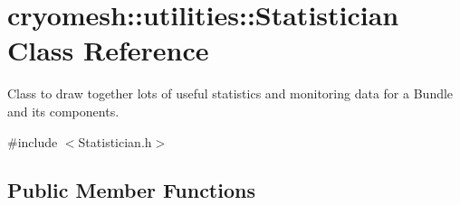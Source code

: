 \hypertarget{classcryomesh_1_1utilities_1_1Statistician}{\section{cryomesh\-:\-:utilities\-:\-:\-Statistician \-Class \-Reference}
\label{classcryomesh_1_1utilities_1_1Statistician}
}


\-Class to draw together lots of useful statistics and monitoring data for a \-Bundle and its components.  




{\ttfamily \#include $<$\-Statistician.\-h$>$}

\subsection*{\-Public \-Member \-Functions}
